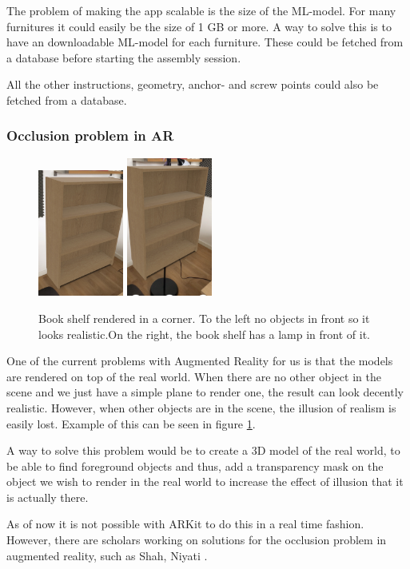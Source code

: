 The problem of making the app scalable is the size of the ML-model. For many furnitures it could
easily be the size of 1 GB or more. A way to solve this is to have an downloadable ML-model for each 
furniture. These could be fetched from a database before starting the assembly session.

All the other instructions, geometry, anchor- and screw points could also be fetched from a database.

\subsubsection{Occlusion problem in AR}
\begin{figure}[hbtp]
\begin{center}
\includegraphics[width = 0.25\textwidth]{./Images/overlapping2.jpg} 
\includegraphics[width = 0.25\textwidth]{./Images/overlapping1.jpg} 
\caption{Book shelf rendered in a corner. To the left no objects in front so it looks realistic.On the right, the book shelf has a lamp in front of it.}
\label{fig:occlusion}
\end{center}
\end{figure}

One of the current problems with Augmented Reality for us is that the models are rendered on top of the real world. When there are no other object in the scene and we just have a simple plane to render one, the result can look decently realistic. However, when other objects are in the scene, the  illusion of realism is easily lost. Example of this can be seen in figure \ref{fig:occlusion}. 

A way to solve this problem would be to create a 3D model of the real world, to be able to find foreground objects and thus, add a transparency mask on the object we wish to render in the real world to increase the effect of illusion that it is actually there.

As of now it is not possible with ARKit to do this in a real time fashion. However, there are scholars working on solutions for the occlusion problem in augmented reality, such as Shah, Niyati \cite{occlusion}.

\newpage
